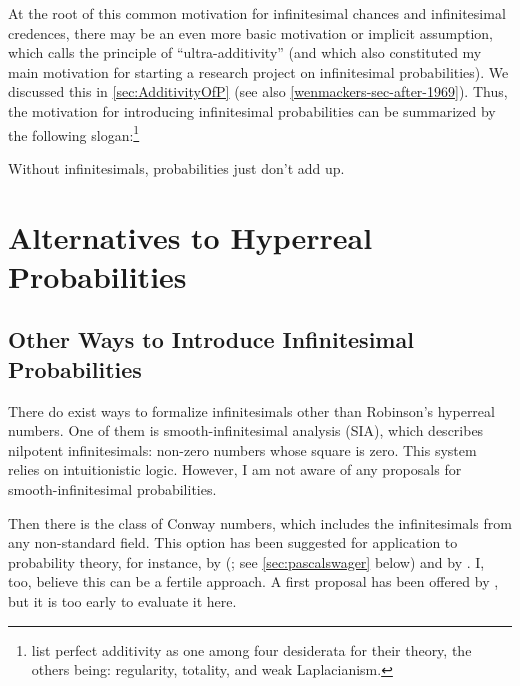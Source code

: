 At the root of this common motivation for infinitesimal chances and infinitesimal credences, there may be an even more basic motivation or implicit assumption, which \citet{Skyrms:1983a} calls the principle of ``ultra-additivity'' (and which also constituted my main motivation for starting a research project on infinitesimal probabilities). We discussed this in \autoref{sec:AdditivityOfP} (see also \autoref{wenmackers-sec-after-1969}).
Thus, the motivation for introducing infinitesimal probabilities can be summarized by the following slogan:\footnote{\citet{Benci_etal:2018} list perfect additivity as one among four desiderata for their theory, the others being: regularity, totality, and weak Laplacianism.}
\begin{center}
Without infinitesimals, probabilities just don't add up.
\end{center}

\section{Alternatives to Hyperreal Probabilities}\label{sec:OtherApproaches}
\subsection{Other Ways to Introduce Infinitesimal Probabilities}
There do exist ways to formalize infinitesimals other than Robinson's hyperreal numbers. One of them is smooth-infinitesimal analysis (SIA), which describes nilpotent infinitesimals: non-zero numbers whose square is zero. This system relies on intuitionistic logic. However, I am not aware of any proposals for smooth-infinitesimal probabilities.

Then there is the class of Conway numbers, which includes the infinitesimals from any non-standard field. This option has been suggested for application to probability theory, for instance, by \citeauthor{Hajek:2003b} (\citeyear{Hajek:2003b}; see \autoref{sec:pascalswager} below) and
by \citet{Easwaran:2014}. I, too, believe this can be a fertile approach. A first proposal has been offered by \citet{ChenRubio:forthc}, but it is too early to evaluate it here.

